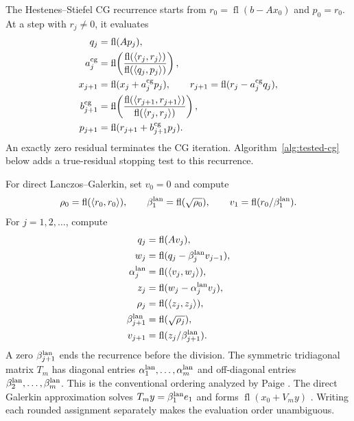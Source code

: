 \documentclass[11pt]{article}
\theoremstyle{definition}
\newcommand{\fl}{\operatorname{fl}}
\begin{document}
The Hestenes--Stiefel CG recurrence \cite{HestenesStiefel1952,Saad2003}
starts from $r_0=\fl(b-Ax_0)$ and $p_0=r_0$. At a step with $r_j\ne0$,
it evaluates
\begin{equation}
\begin{aligned}
 q_j&=\fl(Ap_j),\\
 a_j^{\rm cg}&=\fl\!\left(
       \frac{\fl(\langle r_j,r_j\rangle)}
            {\fl(\langle q_j,p_j\rangle)}\right),\\
 x_{j+1}&=\fl(x_j+a_j^{\rm cg}p_j),\qquad
 r_{j+1}=\fl(r_j-a_j^{\rm cg}q_j),\\
 b_{j+1}^{\rm cg}&=\fl\!\left(
       \frac{\fl(\langle r_{j+1},r_{j+1}\rangle)}
            {\fl(\langle r_j,r_j\rangle)}\right),\\
 p_{j+1}&=\fl(r_{j+1}+b_{j+1}^{\rm cg}p_j).
\end{aligned}
\label{eq:hscg}
\end{equation}
An exactly zero residual terminates the CG iteration. Algorithm~\ref{alg:tested-cg}
below adds a true-residual stopping test to this recurrence.

For direct Lanczos--Galerkin, set $v_0=0$ and compute
\[
 \rho_0=\fl(\langle r_0,r_0\rangle),\qquad
 \beta_1^{\rm lan}=\fl(\sqrt{\rho_0}),\qquad
 v_1=\fl(r_0/\beta_1^{\rm lan}).
\]
For $j=1,2,\ldots$, compute
\begin{equation}
\begin{aligned}
 q_j&=\fl(Av_j),\\
 w_j&=\fl(q_j-\beta_j^{\rm lan}v_{j-1}),\\
 \alpha_j^{\rm lan}&=\fl(\langle v_j,w_j\rangle),\\
 z_j&=\fl(w_j-\alpha_j^{\rm lan}v_j),\\
 \rho_j&=\fl(\langle z_j,z_j\rangle),\\
 \beta_{j+1}^{\rm lan}&=\fl(\sqrt{\rho_j}),\\
 v_{j+1}&=\fl(z_j/\beta_{j+1}^{\rm lan}).
\end{aligned}
\label{eq:scalar-lanczos-order}
\end{equation}
A zero $\beta_{j+1}^{\rm lan}$ ends the recurrence before the division.
The symmetric tridiagonal matrix $T_m$ has diagonal entries
$\alpha_1^{\rm lan},\ldots,\alpha_m^{\rm lan}$ and off-diagonal entries
$\beta_2^{\rm lan},\ldots,\beta_m^{\rm lan}$.
This is the conventional ordering analyzed by Paige
\cite{Paige1976,Paige1980}. The direct Galerkin approximation solves
$T_my=\beta_1^{\rm lan}e_1$ and forms $\fl(x_0+V_my)$
\cite[Secs.~6.6--6.7]{Saad2003}. Writing each rounded assignment separately
makes the evaluation order unambiguous.
\end{document}
